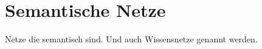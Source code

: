 \chapter{Semantische Netze}
\label{chap:semantische_netze}

Netze die semantisch sind. Und auch Wissensnetze genannt werden.

